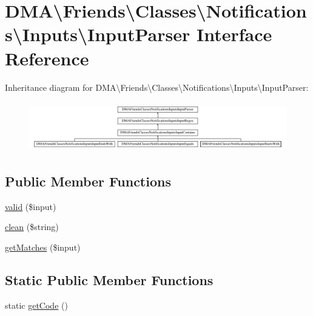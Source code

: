 \hypertarget{interfaceDMA_1_1Friends_1_1Classes_1_1Notifications_1_1Inputs_1_1InputParser}{\section{D\+M\+A\textbackslash{}Friends\textbackslash{}Classes\textbackslash{}Notifications\textbackslash{}Inputs\textbackslash{}Input\+Parser Interface Reference}
\label{interfaceDMA_1_1Friends_1_1Classes_1_1Notifications_1_1Inputs_1_1InputParser}
}
Inheritance diagram for D\+M\+A\textbackslash{}Friends\textbackslash{}Classes\textbackslash{}Notifications\textbackslash{}Inputs\textbackslash{}Input\+Parser\+:\begin{figure}[H]
\begin{center}
\leavevmode
\includegraphics[height=2.189638cm]{d5/d9c/interfaceDMA_1_1Friends_1_1Classes_1_1Notifications_1_1Inputs_1_1InputParser}
\end{center}
\end{figure}
\subsection*{Public Member Functions}
\begin{DoxyCompactItemize}
\item 
\hyperlink{interfaceDMA_1_1Friends_1_1Classes_1_1Notifications_1_1Inputs_1_1InputParser_aff740c6a54419e9e04f699554ed26267}{valid} (\$input)
\item 
\hyperlink{interfaceDMA_1_1Friends_1_1Classes_1_1Notifications_1_1Inputs_1_1InputParser_ae55bc02284a0a2a68d576847ccbd0dc4}{clean} (\$string)
\item 
\hyperlink{interfaceDMA_1_1Friends_1_1Classes_1_1Notifications_1_1Inputs_1_1InputParser_ae7f03d911b0981b8557aa35dd5ea5b55}{get\+Matches} (\$input)
\end{DoxyCompactItemize}
\subsection*{Static Public Member Functions}
\begin{DoxyCompactItemize}
\item 
static \hyperlink{interfaceDMA_1_1Friends_1_1Classes_1_1Notifications_1_1Inputs_1_1InputParser_adaefcdcdfd7a28cad4f7418112243cd2}{get\+Code} ()
\end{DoxyCompactItemize}


